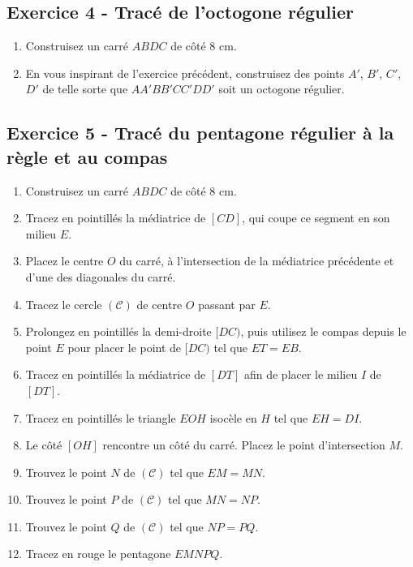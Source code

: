 \documentclass[14 pt]{extarticle}
\theoremstyle{plain}
\begin{document}
\subsection*{Exercice 4 - Tracé de l'octogone régulier}


\begin{enumerate}

\item Construisez un carré $ABDC$ de côté $8$ cm. 
\item En vous inspirant de l'exercice précédent, construisez des points $A'$, $B'$, $C'$, $D'$ de telle sorte que $AA'BB'CC'DD'$ soit un octogone régulier.
\end{enumerate}


\subsection*{Exercice 5 - Tracé du pentagone régulier à la règle et au compas}


\begin{enumerate}

\item Construisez un carré $ABDC$ de côté $8$ cm. 
\item Tracez en pointillés la médiatrice de $[CD]$, qui coupe ce segment en son milieu $E$. 
\item Placez le centre $O$ du carré, à l'intersection de la médiatrice précédente et d'une des diagonales du carré. 
\item Tracez le cercle $(\mathcal C)$ de centre $O$ passant par $E$. 
\item Prolongez en pointillés la demi-droite $[DC)$, puis utilisez le compas depuis le point $E$ pour placer le point de $[DC)$ tel que $ET=EB$. 
\item Tracez en pointillés la médiatrice de $[DT]$ afin de placer le milieu $I$ de $[DT]$. 
\item Tracez en pointillés le triangle $EOH$ isocèle en $H$ tel que $EH= DI$. 
\item Le côté $[OH]$ rencontre un côté du carré. Placez le point d'intersection $M$.
\item Trouvez le point $N$ de $(\mathcal C)$ tel que $EM= MN$. 
\item Trouvez le point $P$ de $(\mathcal C)$ tel que $MN=NP$. 
\item Trouvez le point $Q$ de $(\mathcal C)$ tel que $NP=PQ$. 
\item Tracez en rouge le pentagone $EMNPQ$. 
\end{enumerate}
\end{document}
